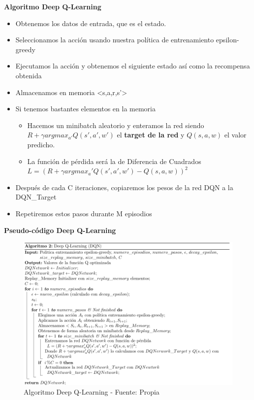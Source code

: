 \documentclass[
  a4paper,
  DIV=11,
  numbers=noendperiod]{scrreprt}
\providecommand{\tightlist}{%
  \setlength{\itemsep}{0pt}\setlength{\parskip}{0pt}}\usepackage{longtable,booktabs,array}
\begin{document}
\textbf{Algoritmo Deep Q-Learning}

\begin{itemize}
\tightlist
\item
  Obtenemos los datos de entrada, que es el estado.
\item
  Seleccionamos la acción usando nuestra política de entrenamiento
  epsilon-greedy
\item
  Ejecutamos la acción y obtenemos el siguiente estado así como la
  recompensa obtenida
\item
  Almacenamos en memoria \textless s,a,r,s'\textgreater{}
\item
  Si tenemos bastantes elementos en la memoria

  \begin{itemize}
  \tightlist
  \item
    Hacemos un minibatch aleatorio y enteramos la red siendo
    \(R+\gamma argmax_{a'}Q(s',a',w')\) el \textbf{target de la red} y
    \(Q(s,a,w)\) el valor predicho.
  \item
    La función de pérdida será la de Diferencia de Cuadrados
    \(L = (R+\gamma argmax_a'Q(s',a',w')-Q(s,a,w))^2\)
  \end{itemize}
\item
  Después de cada C iteraciones, copiaremos los pesos de la red DQN a la
  DQN\_Target
\item
  Repetiremos estos pasos durante M episodios
\end{itemize}

\textbf{Pseudo-código Deep Q-Learning}

\begin{figure}

{\centering \includegraphics[width=1\textwidth,height=\textheight]{imagenes/reinforcement_learning/rl_algoritmo_dqn.png}

}

\caption{Algoritmo Deep Q-Learning - Fuente: Propia}

\end{figure}
\end{document}
